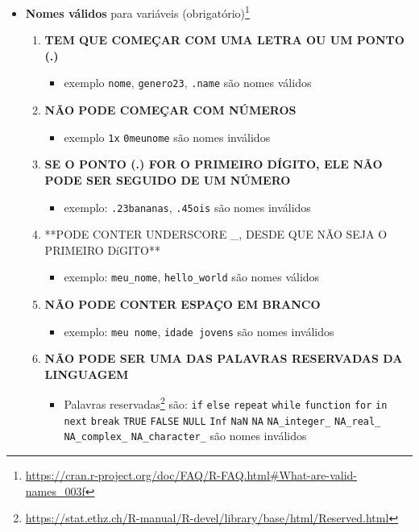 \documentclass[]{book}
\providecommand{\tightlist}{%
  \setlength{\itemsep}{0pt}\setlength{\parskip}{0pt}}
\let\rmarkdownfootnote\footnote%
\def\footnote{\protect\rmarkdownfootnote}
\theoremstyle{definition}
\theoremstyle{definition}
\theoremstyle{definition}
\theoremstyle{remark}
\begin{document}
\begin{itemize}
\item
  \textbf{Nomes válidos} para variáveis (obrigatório)\footnote{\url{https://cran.r-project.org/doc/FAQ/R-FAQ.html\#What-are-valid-names_003f}}

  \begin{enumerate}
  \def\labelenumi{\arabic{enumi}.}
  \tightlist
  \item
    \textbf{TEM QUE COMEÇAR COM UMA LETRA OU UM PONTO (.)}

    \begin{itemize}
    \tightlist
    \item
      exemplo \texttt{nome}, \texttt{genero23}, \texttt{.name} são nomes {válidos}
    \end{itemize}
  \item
    \textbf{NÃO PODE COMEÇAR COM NÚMEROS}

    \begin{itemize}
    \tightlist
    \item
      exemplo \texttt{1x} \texttt{0meunome} são nomes {inválidos}
    \end{itemize}
  \item
    \textbf{SE O PONTO (.) FOR O PRIMEIRO DÍGITO, ELE NÃO PODE SER SEGUIDO DE UM NÚMERO}

    \begin{itemize}
    \tightlist
    \item
      exemplo: \texttt{.23bananas}, \texttt{.45ois} são nomes {inválidos}
    \end{itemize}
  \item
    **PODE CONTER UNDERSCORE \_, DESDE QUE NÃO SEJA O PRIMEIRO DíGITO**

    \begin{itemize}
    \tightlist
    \item
      exemplo: \texttt{meu\_nome}, \texttt{hello\_world} são nomes {válidos}
    \end{itemize}
  \item
    \textbf{NÃO PODE CONTER ESPAÇO EM BRANCO}

    \begin{itemize}
    \tightlist
    \item
      exemplo: \texttt{meu\ nome}, \texttt{idade\ jovens} são nomes {inválidos}
    \end{itemize}
  \item
    \textbf{NÃO PODE SER UMA DAS PALAVRAS RESERVADAS DA LINGUAGEM}

    \begin{itemize}
    \tightlist
    \item
      Palavras reservadas\footnote{\url{https://stat.ethz.ch/R-manual/R-devel/library/base/html/Reserved.html}} são: \texttt{if} \texttt{else} \texttt{repeat} \texttt{while} \texttt{function} \texttt{for} \texttt{in} \texttt{next} \texttt{break} \texttt{TRUE} \texttt{FALSE} \texttt{NULL} \texttt{Inf} \texttt{NaN} \texttt{NA} \texttt{NA\_integer\_} \texttt{NA\_real\_} \texttt{NA\_complex\_} \texttt{NA\_character\_} são nomes {inválidos}
    \end{itemize}
  \end{enumerate}


\end{itemize}
\end{document}
